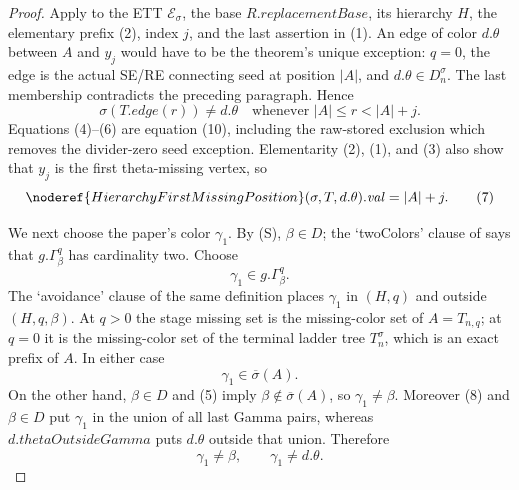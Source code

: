 \begin{proof}
Apply  to the ETT
$\mathcal E_\sigma$, the base $R.\mathit{replacementBase}$, its
hierarchy $H$, the elementary prefix (2), index $j$, and the last
assertion in (1).  An edge of color $d.\theta$ between $A$ and $y_j$
would have to be the theorem's unique exception: $q=0$, the edge is the
actual SE/RE connecting seed at position $|A|$, and
$d.\theta\in D_n^\sigma$.  The last membership contradicts the preceding
paragraph.  Hence
\[
 \sigma(T.\mathit{edge}(r))\ne d.\theta
       \quad\text{whenever }|A|\le r<|A|+j.                    \tag{6}
\]
Equations (4)--(6) are equation (10), including the raw-stored
exclusion which removes the divider-zero seed exception.  Elementarity
(2), (1), and (3) also show that $y_j$ is the first theta-missing
vertex, so
\[
 \noderef{HierarchyFirstMissingPosition}(\sigma,T,d.\theta).
      \mathit{val}=|A|+j.                                     \tag{7}
\]

We next choose the paper's color $\gamma_1$.  By (S), $\beta\in D$;
the `twoColors' clause of  says that
$g.\Gamma^q_\beta$ has cardinality two.  Choose
\[
                         \gamma_1\in g.\Gamma^q_\beta.         \tag{8}
\]
The `avoidance' clause of the same definition places $\gamma_1$ in
$(H,q)$ and outside
$(H,q,\beta)$.  At $q>0$ the stage
missing set is the missing-color set of $A=T_{n,q}$; at $q=0$ it is the
missing-color set of the terminal ladder tree $T_n^\sigma$, which is an
exact prefix of $A$.  In either case
\[
              \gamma_1\in\overline\sigma(A).                  \tag{9}
\]
On the other hand, $\beta\in D$ and (5) imply
$\beta\notin\overline\sigma(A)$, so $\gamma_1\ne\beta$.
Moreover (8) and $\beta\in D$ put $\gamma_1$ in the union of all last
Gamma pairs, whereas $d.\mathit{thetaOutsideGamma}$ puts $d.\theta$
outside that union.  Therefore
\[
              \gamma_1\ne\beta,\qquad\gamma_1\ne d.\theta.   \tag{10}
\]


\end{proof}
